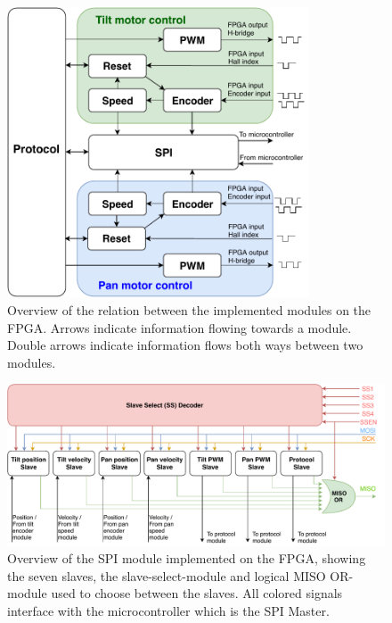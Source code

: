 \documentclass[../../main.tex]{subfiles}
\begin{document}
\begin{figure}
    \centering
    \includegraphics[width=0.8\textwidth]{Sections/System_Implementation/Images/FPGALogicBothMotors.pdf}
    \caption{Overview of the relation between the implemented modules on the FPGA. Arrows indicate information flowing towards a module. Double arrows indicate information flows both ways between two modules.}
    \label{fig:FPGALogicBothMotors}
\end{figure}

\begin{figure}[H]
    \centering
    \includegraphics[width=\textwidth]{Sections/System_Implementation/Images/SPILogicSimple.pdf}
    \caption{Overview of the SPI module implemented on the FPGA, showing the seven slaves, the slave-select-module and logical MISO OR-module used to choose between the slaves. All colored signals interface with the microcontroller which is the SPI Master. } %
    \label{fig:SPILogicSimple}
\end{figure}
\end{document}
